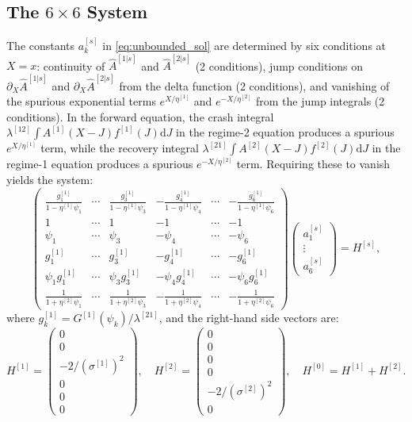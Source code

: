 \documentclass[11pt,a4paper]{article}
\numberwithin{equation}{section}
\newcommand{\dd}{\mathrm{d}}
\begin{document}
\begin{appendices}
\subsection{The $6 \times 6$ System}\label{app:6x6_system}

The constants $a^{[s]}_k$ in \eqref{eq:unbounded_sol} are determined by six conditions at $X = x$: continuity of $\hat{A}^{[1|s]}$ and $\hat{A}^{[2|s]}$ (2 conditions), jump conditions on $\partial_X \hat{A}^{[1|s]}$ and $\partial_X \hat{A}^{[2|s]}$ from the delta function (2 conditions), and vanishing of the spurious exponential terms $e^{X/\eta^{[1]}}$ and $e^{-X/\eta^{[2]}}$ from the jump integrals (2 conditions). In the forward equation, the crash integral $\lambda^{[12]}\int A^{[1]}(X-J)f^{[1]}(J)\dd J$ in the regime-2 equation produces a spurious $e^{X/\eta^{[1]}}$ term, while the recovery integral $\lambda^{[21]}\int A^{[2]}(X-J)f^{[2]}(J)\dd J$ in the regime-1 equation produces a spurious $e^{-X/\eta^{[2]}}$ term. Requiring these to vanish yields the system:
\begin{equation}\label{eq:6x6_full}
\begin{pmatrix}
\frac{g^{[1]}_1}{1-\eta^{[1]}\psi_1} & \cdots & \frac{g^{[1]}_3}{1-\eta^{[1]}\psi_3} & -\frac{g^{[1]}_4}{1-\eta^{[1]}\psi_4} & \cdots & -\frac{g^{[1]}_6}{1-\eta^{[1]}\psi_6} \\
1 & \cdots & 1 & -1 & \cdots & -1 \\
\psi_1 & \cdots & \psi_3 & -\psi_4 & \cdots & -\psi_6 \\
g^{[1]}_1 & \cdots & g^{[1]}_3 & -g^{[1]}_4 & \cdots & -g^{[1]}_6 \\
\psi_1 g^{[1]}_1 & \cdots & \psi_3 g^{[1]}_3 & -\psi_4 g^{[1]}_4 & \cdots & -\psi_6 g^{[1]}_6 \\
\frac{1}{1+\eta^{[2]}\psi_1} & \cdots & \frac{1}{1+\eta^{[2]}\psi_3} & -\frac{1}{1+\eta^{[2]}\psi_4} & \cdots & -\frac{1}{1+\eta^{[2]}\psi_6}
\end{pmatrix}
\begin{pmatrix} a^{[s]}_1 \\ \vdots \\ a^{[s]}_6 \end{pmatrix}
= H^{[s]},
\end{equation}
where $g^{[1]}_k = G^{[1]}(\psi_k)/\lambda^{[21]}$, and the right-hand side vectors are:
\begin{equation}
H^{[1]} = \begin{pmatrix} 0 \\ 0 \\ -2/(\sigma^{[1]})^2 \\ 0 \\ 0 \\ 0 \end{pmatrix}, \quad
H^{[2]} = \begin{pmatrix} 0 \\ 0 \\ 0 \\ 0 \\ -2/(\sigma^{[2]})^2 \\ 0 \end{pmatrix}, \quad
H^{[0]} = H^{[1]} + H^{[2]}.
\end{equation}


\end{appendices}
\end{document}
